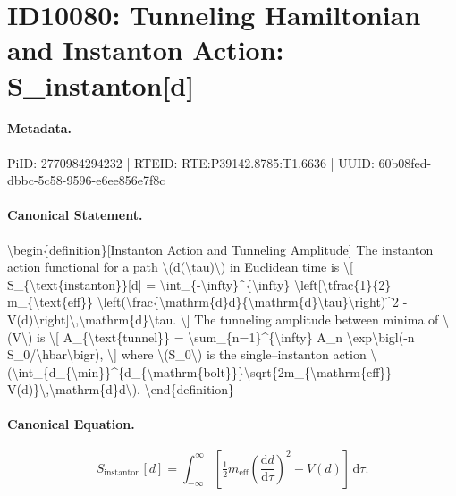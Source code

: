 \section*{ID10080: Tunneling Hamiltonian and Instanton Action: S\_instanton[d]}
\paragraph{Metadata.}
PiID: 2770984294232 | RTEID: RTE:P39142.8785:T1.6636 | UUID: 60b08fed-dbbc-5c58-9596-e6ee856e7f8c

\paragraph{Canonical Statement.}
\textbackslash{}begin\{definition\}[Instanton Action and Tunneling Amplitude] The instanton action functional for a path \textbackslash{}(d(\textbackslash{}tau)\textbackslash{}) in Euclidean time is \textbackslash{}[ S\_\{\textbackslash{}text\{instanton\}\}[d] = \textbackslash{}int\_\{-\textbackslash{}infty\}\textasciicircum{}\{\textbackslash{}infty\} \textbackslash{}left[\textbackslash{}tfrac\{1\}\{2\} m\_\{\textbackslash{}text\{eff\}\} \textbackslash{}left(\textbackslash{}frac\{\textbackslash{}mathrm\{d\}d\}\{\textbackslash{}mathrm\{d\}\textbackslash{}tau\}\textbackslash{}right)\textasciicircum{}2 - V(d)\textbackslash{}right]\textbackslash{},\textbackslash{}mathrm\{d\}\textbackslash{}tau. \textbackslash{}] The tunneling amplitude between minima of \textbackslash{}(V\textbackslash{}) is \textbackslash{}[ A\_\{\textbackslash{}text\{tunnel\}\} = \textbackslash{}sum\_\{n=1\}\textasciicircum{}\{\textbackslash{}infty\} A\_n \textbackslash{}exp\textbackslash{}bigl(-n S\_0/\textbackslash{}hbar\textbackslash{}bigr), \textbackslash{}] where \textbackslash{}(S\_0\textbackslash{}) is the single–instanton action \textbackslash{}(\textbackslash{}int\_\{d\_\{\textbackslash{}min\}\}\textasciicircum{}\{d\_\{\textbackslash{}mathrm\{bolt\}\}\}\textbackslash{}sqrt\{2m\_\{\textbackslash{}mathrm\{eff\}\} V(d)\}\textbackslash{},\textbackslash{}mathrm\{d\}d\textbackslash{}). \textbackslash{}end\{definition\}

\paragraph{Canonical Equation.}
\[
S_{\text{instanton}}[d] = \int_{-\infty}^{\infty} \left[\tfrac{1}{2} m_{\text{eff}} \left(\frac{\mathrm{d}d}{\mathrm{d}\tau}\right)^2 - V(d)\right]\,\mathrm{d}\tau.
\]

